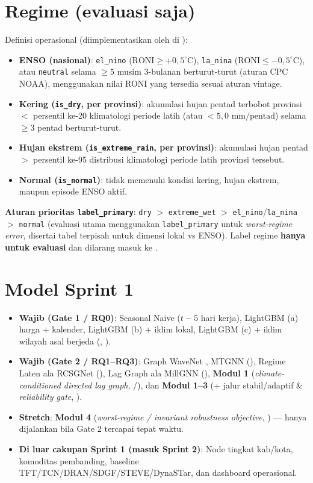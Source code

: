 \documentclass[11pt,a4paper]{article}
\begin{document}
\section{Regime (evaluasi saja)}
Definisi operasional (diimplementasikan oleh  di ):
\begin{itemize}
  \item \textbf{ENSO (nasional)}: \texttt{el\_nino} ($\text{RONI} \ge +0{,}5^\circ\text{C}$), \texttt{la\_nina} ($\text{RONI} \le -0{,}5^\circ\text{C}$), atau \texttt{neutral} selama $\ge 5$ musim 3-bulanan berturut-turut (aturan CPC NOAA), menggunakan nilai RONI yang tersedia sesuai aturan vintage.
  \item \textbf{Kering (\texttt{is\_dry}, per provinsi)}: akumulasi hujan pentad terbobot provinsi $<$ persentil ke-20 klimatologi periode latih (atau $< 5{,}0\text{ mm/pentad}$) selama $\ge 3$ pentad berturut-turut.
  \item \textbf{Hujan ekstrem (\texttt{is\_extreme\_rain}, per provinsi)}: akumulasi hujan pentad $>$ persentil ke-95 distribusi klimatologi periode latih provinsi tersebut.
  \item \textbf{Normal (\texttt{is\_normal})}: tidak memenuhi kondisi kering, hujan ekstrem, maupun episode ENSO aktif.
\end{itemize}
\textbf{Aturan prioritas \texttt{label\_primary}}: \texttt{dry} $>$ \texttt{extreme\_wet} $>$ \texttt{el\_nino}/\texttt{la\_nina} $>$ \texttt{normal} (evaluasi utama menggunakan \texttt{label\_primary} untuk \emph{worst-regime error}, disertai tabel terpisah untuk dimensi lokal vs ENSO). Label regime \textbf{hanya untuk evaluasi} dan dilarang masuk ke .

\section{Model Sprint 1}
\begin{itemize}
  \item \textbf{Wajib (Gate 1 / RQ0)}: Seasonal Naive ($t-5$ hari kerja), LightGBM (a) harga + kalender, LightGBM (b) + iklim lokal, LightGBM (c) + iklim wilayah asal berjeda (, ).
  \item \textbf{Wajib (Gate 2 / RQ1--RQ3)}: Graph WaveNet \cite{wu2019gwn}, MTGNN \cite{wu2020mtgnn} (), Regime Laten ala RCSGNet \cite{bai2026rcsgnet} (), Lag Graph ala MillGNN \cite{millgnn2025} (), \textbf{Modul 1} (\emph{climate-conditioned directed lag graph}, /), dan \textbf{Modul 1--3} (+ jalur stabil/adaptif \& \emph{reliability gate}, ).
  \item \textbf{Stretch}: \textbf{Modul 4} (\emph{worst-regime / invariant robustness objective}, ) --- hanya dijalankan bila Gate 2 tercapai tepat waktu.
  \item \textbf{Di luar cakupan Sprint 1 (masuk Sprint 2)}: Node tingkat kab/kota, komoditas pembanding, baseline TFT/TCN/DRAN/SDGF/STEVE/DynaSTar, dan dashboard operasional.
\end{itemize}
\end{document}
